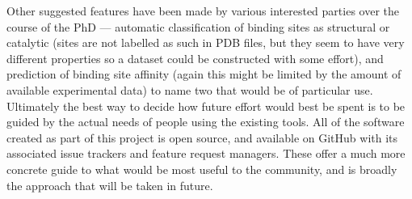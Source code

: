 Other suggested features have been made by various interested parties over the course of the PhD --- automatic classification of binding sites as structural or catalytic (sites are not labelled as such in PDB files, but they seem to have very different properties so a dataset could be constructed with some effort), and prediction of binding site affinity (again this might be limited by the amount of available experimental data) to name two that would be of particular use. Ultimately the best way to decide how future effort would best be spent is to be guided by the actual needs of people using the existing tools. All of the software created as part of this project is open source, and available on GitHub with its associated issue trackers and feature request managers. These offer a much more concrete guide to what would be most useful to the community, and is broadly the approach that will be taken in future.


